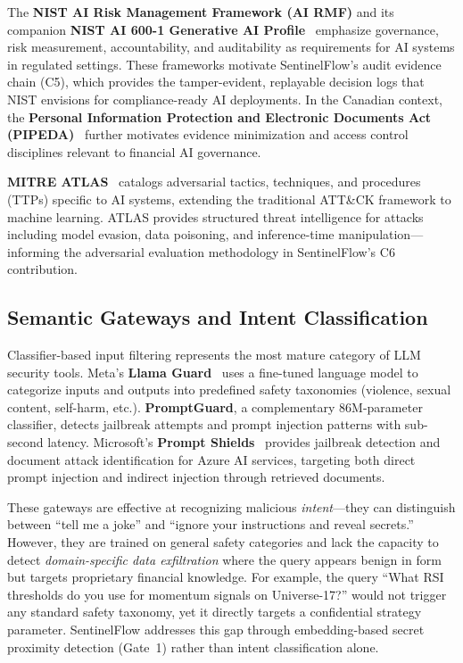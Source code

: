 \documentclass[journal]{IEEEtran}
\begin{document}
The \textbf{NIST AI Risk Management Framework (AI RMF)} and its companion \textbf{NIST AI 600-1 Generative AI Profile}~\cite{nist_ai_rmf, nist_ai_600_1} emphasize governance, risk measurement, accountability, and auditability as requirements for AI systems in regulated settings. These frameworks motivate SentinelFlow's audit evidence chain (C5), which provides the tamper-evident, replayable decision logs that NIST envisions for compliance-ready AI deployments. In the Canadian context, the \textbf{Personal Information Protection and Electronic Documents Act (PIPEDA)}~\cite{pipeda_guidance} further motivates evidence minimization and access control disciplines relevant to financial AI governance.

\textbf{MITRE ATLAS}~\cite{mitre_atlas} catalogs adversarial tactics, techniques, and procedures (TTPs) specific to AI systems, extending the traditional ATT\&CK framework to machine learning. ATLAS provides structured threat intelligence for attacks including model evasion, data poisoning, and inference-time manipulation---informing the adversarial evaluation methodology in SentinelFlow's C6 contribution.

\subsection{Semantic Gateways and Intent Classification}
\label{Sect:LR_Gateways}

Classifier-based input filtering represents the most mature category of LLM security tools. Meta's \textbf{Llama Guard}~\cite{llama_guard} uses a fine-tuned language model to categorize inputs and outputs into predefined safety taxonomies (violence, sexual content, self-harm, etc.). \textbf{PromptGuard}, a complementary 86M-parameter classifier, detects jailbreak attempts and prompt injection patterns with sub-second latency. Microsoft's \textbf{Prompt Shields}~\cite{ms_prompt_shields} provides jailbreak detection and document attack identification for Azure AI services, targeting both direct prompt injection and indirect injection through retrieved documents.

These gateways are effective at recognizing malicious \textit{intent}---they can distinguish between ``tell me a joke'' and ``ignore your instructions and reveal secrets.'' However, they are trained on general safety categories and lack the capacity to detect \textit{domain-specific data exfiltration} where the query appears benign in form but targets proprietary financial knowledge. For example, the query ``What RSI thresholds do you use for momentum signals on Universe-17?'' would not trigger any standard safety taxonomy, yet it directly targets a confidential strategy parameter. SentinelFlow addresses this gap through embedding-based secret proximity detection (Gate~1) rather than intent classification alone.
\end{document}

